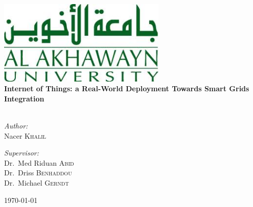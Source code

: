 \begin{titlepage}
\begin{center}
\includegraphics[width=0.6\textwidth]{img/aui_logo.jpg}
\linebreak
\linebreak
\linebreak
\HRule \\[0.4cm]
{ \huge \bfseries Internet of Things: a Real-World Deployment Towards Smart Grids Integration}\\[0.4cm]

\HRule \\[1.5cm]

\begin{minipage}{0.4\textwidth}
\begin{flushleft} \large
\emph{Author:}\\
Nacer \textsc{Khalil}
\end{flushleft}
\end{minipage}
\begin{minipage}{0.4\textwidth}
\begin{flushright} \large
\emph{Supervisor:} \\
Dr.~Med Riduan \textsc{Abid} \\
Dr.~Driss \textsc{Benhaddou} \\
Dr.~Michael \textsc{Gerndt} 
\end{flushright}
\end{minipage}

\vfill

{\large \today}

\end{center}
\end{titlepage}
